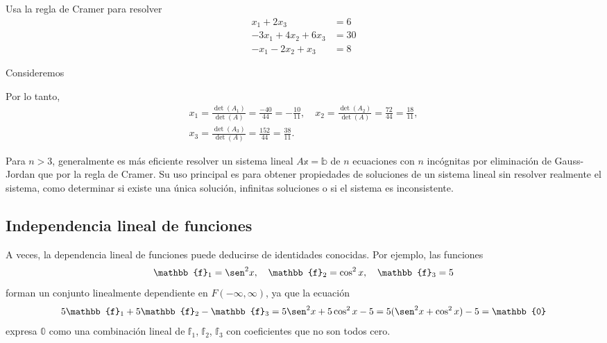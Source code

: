 \begin{examplebox}{}{}
    Usa la regla de Cramer para resolver
    \begin{align*}
        x_1 + 2x_3 & = 6 \\
        -3x_1 + 4x_2 + 6x_3 & = 30 \\
        -x_1 - 2x_2 + x_3 & = 8
    \end{align*}

    \tcblower
    \solucion Consideremos
    \begin{matrizn}
    \end{matrizn}
    Por lo tanto,
    \begin{gather*}
        x_1 = \frac{\det(A_1)}{\det(A)} = \frac{-40}{44} = - \frac{10}{11}, \quad x_2 = \frac{\det(A_2)}{\det(A)} = \frac{72}{44} = \frac{18}{11}, \\[2mm]
        x_3 = \frac{\det(A_3)}{\det(A)} = \frac{152}{44} = \frac{38}{11}.
    \end{gather*}
\end{examplebox}

Para $n > 3$, generalmente es más eficiente resolver un sistema lineal $A\mathbb{x} = \mathbb{b}$ de $n$ ecuaciones con $n$ incógnitas por eliminación de Gauss-Jordan que por la regla de Cramer. Su uso principal es para obtener propiedades de soluciones de un sistema lineal sin resolver realmente el sistema, como determinar si existe una única solución, infinitas soluciones o si el sistema es inconsistente.

\newpage

\subsection*{Independencia lineal de funciones}

A veces, la dependencia lineal de funciones puede deducirse de identidades conocidas. Por ejemplo, las funciones
$$\mathbb{f}_1 = \sen^2 x, \quad \mathbb{f}_2 = \cos^2 x, \quad \mathbb{f}_3 = 5$$
forman un conjunto linealmente dependiente en $F(-\infty, \infty)$, ya que la ecuación
$$5\mathbb{f}_1 + 5\mathbb{f}_2 - \mathbb{f}_3 = 5 \sen^2 x + 5 \cos^2 x - 5 = 5(\sen^2 x + \cos^2 x) - 5 = \mathbb{0}$$
expresa $\mathbb{0}$ como una combinación lineal de $\mathbb{f}_1$, $\mathbb{f}_2$, $\mathbb{f}_3$ con coeficientes que no son todos cero.

